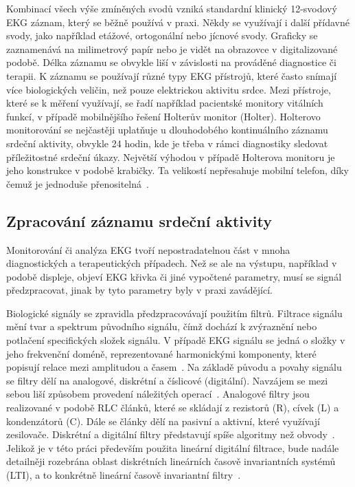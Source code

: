 Kombinací všech výše zmíněných svodů vzniká standardní klinický 12-svodový EKG
záznam, který se běžně používá v praxi. Někdy se využívají i další přídavné
svody, jako například etážové, ortogonální nebo jícnové svody. Graficky se
zaznamenává na milimetrový papír nebo je vidět na obrazovce v digitalizované
podobě. Délka záznamu se obvykle liší v závislosti na prováděné diagnostice či
terapii. K záznamu se používají různé typy EKG přístrojů, které často snímají
více biologických veličin, než pouze elektrickou aktivitu srdce. Mezi přístroje,
které se k měření využívají, se řadí například pacientské monitory vitálních
funkcí, v případě mobilnějšího řešení Holterův monitor (Holter). Holterovo
monitorování se nejčastěji uplatňuje u dlouhodobého kontinuálního záznamu
srdeční aktivity, obvykle 24 hodin, kde je třeba v rámci diagnostiky sledovat
příležitostné srdeční úkazy. Největší výhodou v případě Holterova monitoru je
jeho konstrukce v podobě krabičky. Ta velikostí nepřesahuje mobilní telefon,
díky čemuž je jednoduše přenositelná~\cite{Surawicz2008}.

\subsection{Zpracování záznamu srdeční aktivity}
\label{section:ecg_processing_theory}
Monitorování či analýza EKG tvoří nepostradatelnou část v mnoha diagnostických a
terapeutických případech. Než se ale na výstupu, například v podobě displeje,
objeví EKG křivka či jiné vypočtené parametry, musí se signál
předzpracovat, jinak by tyto parametry byly v praxi zavádějící.

Biologické signály se zpravidla předzpracovávají použitím filtrů. Filtrace
signálu mění tvar a spektrum původního signálu, čímž dochází k zvýraznění nebo
potlačení specifických složek signálu. V případě EKG signálu se jedná o složky v
jeho frekvenční doméně, reprezentované harmonickými komponenty, které popisují
relace mezi amplitudou a časem~\cite{Jan2002}. Na základě původu a povahy
signálu se filtry dělí na analogové, diskrétní a číslicové (digitální). Navzájem
se mezi sebou liší způsobem provedení náležitých operací~\cite{Skop1994}.
Analogové filtry jsou realizované v podobě RLC článků, které se skládají z
rezistorů (R), cívek (L) a kondenzátorů (C). Dále se články dělí na pasivní a
aktivní, které využívají zesilovače. Diskrétní a digitální filtry představují
spíše algoritmy než obvody~\cite{Prchal2000}. Jelikož je v této práci především
použita lineární digitální filtrace, bude nadále detailněji rozebrána oblast
diskrétních lineárních časově invariantních systémů (LTI), a to konkrétně
lineární časově invariantní filtry~\cite{Jan2002}.

